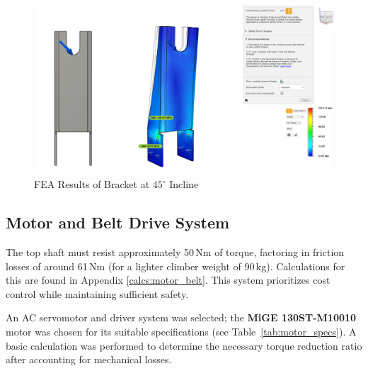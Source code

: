 \begin{figure}[ht]
    \centering
    \includegraphics[width=0.8\linewidth]{figs/final_design/FEMBracket45.png}
    \caption{FEA Results of Bracket at $45^\circ$ Incline}
    \label{fig:FEM-bracket}
\end{figure}

\subsection{Motor and Belt Drive System}

The top shaft must resist approximately 50\,Nm of torque, factoring in friction losses of around 61\,Nm (for a lighter climber weight of 90\,kg). Calculations for this are found in Appendix \ref{calcs:motor_belt}. This system prioritizes cost control while maintaining sufficient safety.

An AC servomotor and driver system was selected; the \textbf{MiGE 130ST-M10010} motor was chosen for its suitable specifications (see Table~\ref{tab:motor_specs}). A basic calculation was performed to determine the necessary torque reduction ratio after accounting for mechanical losses.


